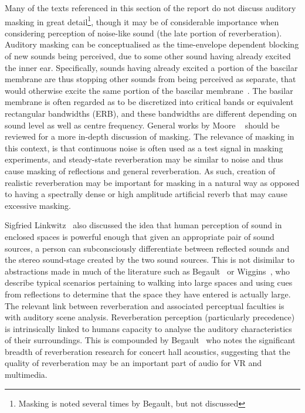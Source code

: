 \documentclass[paper=a4, fontsize=10pt, font=arial]{scrartcl} %
\numberwithin{equation}{section} %
\numberwithin{figure}{section} %
\numberwithin{table}{section} %
\begin{document}
Many of the texts referenced in this section of the report do not discuss auditory masking in great detail\footnote{Masking is noted several times by Begault, but not discussed}, though it may be of considerable importance when considering perception of noise-like sound (the late portion of reverberation).
Auditory masking can be conceptualised as the time-envelope dependent blocking of new sounds being perceived, due to some other sound having already excited the inner ear. 
Specifically, sounds having already excited a portion of the bascilar membrane are thus stopping other sounds from being perceived as separate, that would otherwise excite the same portion of the bascilar membrane~\cite{Everest2009}. 
The basilar membrane is often regarded as to be discretized into critical bands or equivalent rectangular bandwidths (ERB), and these bandwidths are different depending on sound level as well as centre frequency. 
General works by Moore ~\cite{Moore1996} should be reviewed for a more in-depth discussion of masking. The relevance of masking in this context, is that continuous noise is often used as a test signal in masking experiments, and steady-state reverberation may be similar to noise and thus cause masking of reflections and general reverberation. As such, creation of realistic reverberation may be important for masking in a natural way as opposed to having a spectrally dense or high amplitude artificial reverb that may cause excessive masking.

Sigfried Linkwitz~\cite{Linkwitz2015} also discussed the idea that human perception of sound in enclosed spaces is powerful enough that given an appropriate pair of sound sources, a person can subconsciously differentiate between reflected sounds and the stereo sound-stage created by the two sound sources. This is not disimilar to abstractions made in much of the literature such as Begault~\cite{Begault1995} or Wiggins~\cite{Wiggins2004}, who describe typical scenarios pertaining to walking into large spaces and using cues from reflections to determine that the space they have entered is actually large. The relevant link between reverberation and associated perceptual faculties is with auditory scene analysis. Reverberation perception (particularly precedence) is intrinsically linked to humans capacity to analyse the auditory characteristics of their surroundings. This is compounded by Begault~\cite{Begault1995} who notes the significant breadth of reverberation research for concert hall acoustics, suggesting that the quality of reverberation may be an important part of audio for VR and multimedia.\\ 
\end{document}
